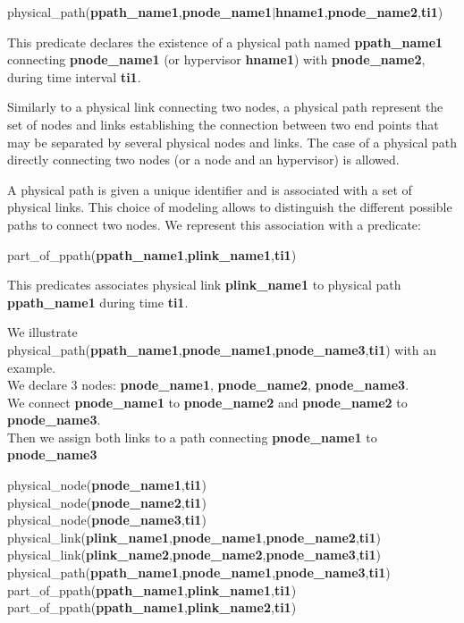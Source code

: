 \begin{myformula}
physical\_path(\textbf{ppath\_name1},\textbf{pnode\_name1}$\vert$\textbf{hname1},\textbf{pnode\_name2},\textbf{ti1})
\end{myformula}

This predicate declares the existence of a physical path named \textbf{ppath\_name1} connecting \textbf{pnode\_name1} (or hypervisor \textbf{hname1}) with \textbf{pnode\_name2}, during time interval \textbf{ti1}. 

Similarly to a physical link connecting two nodes, a physical path represent the set of nodes and links establishing the connection between two end points that may be separated by several physical nodes and links.
The case of a physical path directly connecting two nodes (or a node and an hypervisor) is allowed.

A physical path is given a unique identifier and is associated with a set of physical links. 
This choice of modeling allows to distinguish the different possible paths to connect two nodes. 
We represent this association with a predicate:

\begin{myformula}
part\_of\_ppath(\textbf{ppath\_name1},\textbf{plink\_name1},\textbf{ti1})
\end{myformula}


This predicates associates physical link \textbf{plink\_name1} to physical path \textbf{ppath\_name1} during time \textbf{ti1}.

We illustrate physical\_path(\textbf{ppath\_name1},\textbf{pnode\_name1},\textbf{pnode\_name3},\textbf{ti1}) with an example.\\
We declare 3 nodes: \textbf{pnode\_name1}, \textbf{pnode\_name2}, \textbf{pnode\_name3}.\\
We connect \textbf{pnode\_name1} to \textbf{pnode\_name2} and \textbf{pnode\_name2} to \textbf{pnode\_name3}.\\
Then we assign both links to a path connecting \textbf{pnode\_name1} to \textbf{pnode\_name3}

\begin{myformula}
physical\_node(\textbf{pnode\_name1},\textbf{ti1})\\
physical\_node(\textbf{pnode\_name2},\textbf{ti1})\\
physical\_node(\textbf{pnode\_name3},\textbf{ti1})\\
physical\_link(\textbf{plink\_name1},\textbf{pnode\_name1},\textbf{pnode\_name2},\textbf{ti1})\\
physical\_link(\textbf{plink\_name2},\textbf{pnode\_name2},\textbf{pnode\_name3},\textbf{ti1})\\
physical\_path(\textbf{ppath\_name1},\textbf{pnode\_name1},\textbf{pnode\_name3},\textbf{ti1})\\
part\_of\_ppath(\textbf{ppath\_name1},\textbf{plink\_name1},\textbf{ti1})\\
part\_of\_ppath(\textbf{ppath\_name1},\textbf{plink\_name2},\textbf{ti1})
\end{myformula}

